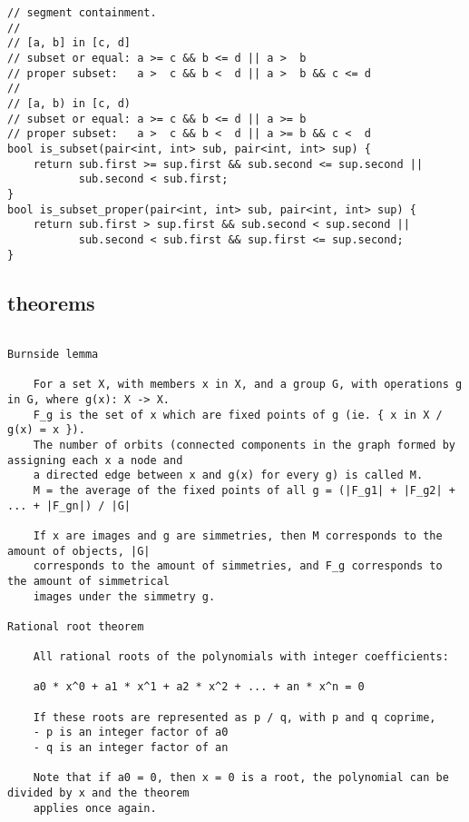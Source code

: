 \documentclass[twoside]{article}
\begin{document}
\begin{multicols*}{2}
\begin{verbatim}
// segment containment.
//
// [a, b] in [c, d]
// subset or equal: a >= c && b <= d || a >  b
// proper subset:   a >  c && b <  d || a >  b && c <= d
//
// [a, b) in [c, d)
// subset or equal: a >= c && b <= d || a >= b
// proper subset:   a >  c && b <  d || a >= b && c <  d
bool is_subset(pair<int, int> sub, pair<int, int> sup) {
    return sub.first >= sup.first && sub.second <= sup.second ||
           sub.second < sub.first;
}
bool is_subset_proper(pair<int, int> sub, pair<int, int> sup) {
    return sub.first > sup.first && sub.second < sup.second ||
           sub.second < sub.first && sup.first <= sup.second;
}
\end{verbatim}

{
\subsection*{theorems}
}
\begin{verbatim}

Burnside lemma

    For a set X, with members x in X, and a group G, with operations g in G, where g(x): X -> X.
    F_g is the set of x which are fixed points of g (ie. { x in X / g(x) = x }).
    The number of orbits (connected components in the graph formed by assigning each x a node and
    a directed edge between x and g(x) for every g) is called M.
    M = the average of the fixed points of all g = (|F_g1| + |F_g2| + ... + |F_gn|) / |G|

    If x are images and g are simmetries, then M corresponds to the amount of objects, |G|
    corresponds to the amount of simmetries, and F_g corresponds to the amount of simmetrical
    images under the simmetry g.

Rational root theorem

    All rational roots of the polynomials with integer coefficients:

    a0 * x^0 + a1 * x^1 + a2 * x^2 + ... + an * x^n = 0

    If these roots are represented as p / q, with p and q coprime,
    - p is an integer factor of a0
    - q is an integer factor of an

    Note that if a0 = 0, then x = 0 is a root, the polynomial can be divided by x and the theorem
    applies once again.


\end{verbatim}
\end{multicols*}
\end{document}
